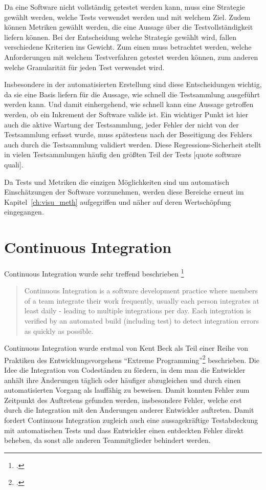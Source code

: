 Da eine Software nicht vollständig getestet werden kann, muss eine Strategie gewählt werden, welche Tests verwendet werden und mit welchem Ziel. Zudem können Metriken gewählt werden, die eine Aussage über die Testvollständigkeit liefern können. Bei der Entscheidung welche Strategie gewählt wird, fallen verschiedene Kriterien ins Gewicht. Zum einen muss betrachtet werden, welche Anforderungen mit welchem Testverfahren getestet werden können, zum anderen welche Granularität für jeden Test verwendet wird.

Insbesondere in der automatisierten Erstellung sind diese Entscheidungen wichtig, da sie eine Basis liefern für die Aussage, wie schnell die Testsammlung ausgeführt werden kann. Und damit einhergehend, wie schnell kann eine Aussage getroffen werden, ob ein Inkrement der Software valide ist. 
Ein wichtiger Punkt ist hier auch die aktive Wartung der Testsammlung, jeder Fehler der nicht von der Testsammlung erfasst wurde, muss spätestens nach der Beseitigung des Fehlers auch durch die Testsammlung validiert werden. Diese Regressions-Sicherheit stellt in vielen Testsammlungen häufig den größten Teil der Tests [quote software quali].

Da Tests und Metriken die einzigen Möglichkeiten sind um automatisch Einschätzungen der Software vorzunehmen, werden diese Bereiche erneut im Kapitel~\ref{ch:visu_meth} aufgegriffen und näher auf deren Wertschöpfung eingegangen.

\section{Continuous Integration}

Continuous Integration wurde sehr treffend beschrieben \footcite{fowler2006}
\blockquote {Continuous Integration is a software development practice where members of a team integrate their work frequently, usually each person integrates at least daily - leading to multiple integrations per day. Each integration is verified by an automated build (including test) to detect integration errors as quickly as possible.}

Continuous Integration wurde erstmal von Kent Beck als Teil einer Reihe von Praktiken des Entwicklungsvorgehens ``Extreme Programming''\footcite{kent1999} beschrieben. Die Idee die Integration von Codeständen zu fördern, in dem man die Entwickler anhält ihre Änderungen täglich oder häufiger abzugleichen und durch einen automatisierten Vorgang als lauffähig zu beweisen. Damit konnten Fehler zum Zeitpunkt des Auftretens gefunden werden, insbesondere Fehler, welche erst durch die Integration mit den Änderungen anderer Entwickler auftreten. Damit fordert Continuous Integration zugleich auch eine aussagekräftige Testabdeckung mit automatischen Tests und dass Entwickler einen entdeckten Fehler direkt beheben, da sonst alle anderen Teammitglieder behindert werden.

